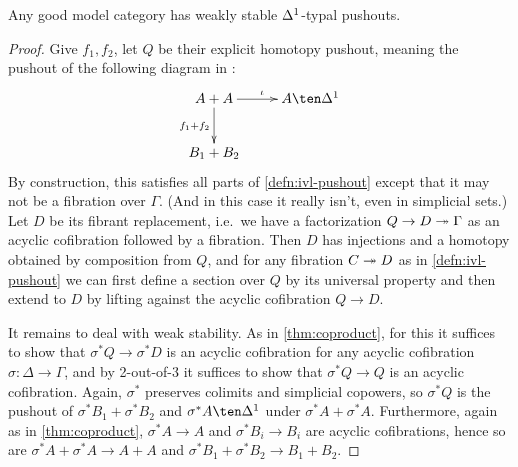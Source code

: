 \documentclass{amsart}
\begin{document}
\begin{thm}
  Any good model category has weakly stable ${\Delta^1}$-typal pushouts.
\end{thm}
\begin{proof}
  Give $f_1,f_2$, let $Q$ be their explicit homotopy pushout, meaning the pushout of the following diagram in \sM:
  \[ \xymatrix{ A+A \ar[r]^{\iota} \ar[d]_{f_1+f_2} & A\ten\ivl \\ B_1+B_2 } \]
  By construction, this satisfies all parts of \cref{defn:ivl-pushout} except that it may not be a fibration over $\Gamma$.
  (And in this case it really isn't, even in simplicial sets.)
  Let $D$ be its fibrant replacement, i.e.\ we have a factorization $Q\to D \twoheadrightarrow \Gamma$ as an acyclic cofibration followed by a fibration.
  Then $D$ has injections and a homotopy obtained by composition from $Q$, and for any fibration $C\twoheadrightarrow D$ as in \cref{defn:ivl-pushout} we can first define a section over $Q$ by its universal property and then extend to $D$ by lifting against the acyclic cofibration $Q\to D$.

  It remains to deal with weak stability.
  As in \cref{thm:coproduct}, for this it suffices to show that $\sigma^*Q\to\sigma^*D$ is an acyclic cofibration for any acyclic cofibration $\sigma:\Delta\to\Gamma$, and by 2-out-of-3 it suffices to show that $\sigma^*Q \to Q$ is an acyclic cofibration.
  Again, $\sigma^*$ preserves colimits and simplicial copowers, so $\sigma^*Q $ is the pushout of $\sigma^*B_1+\sigma^*B_2$ and $\sigma^*A \ten\ivl$ under $\sigma^*A+\sigma^*A$.
  Furthermore, again as in \cref{thm:coproduct}, $\sigma^*A \to A$ and $\sigma^*B_i \to B_i$ are acyclic cofibrations, hence so are $\sigma^*A+\sigma^*A \to A+A$ and ${\sigma^*B_1 +\sigma^*B_2} \to B_1+B_2$.


\end{proof}
\end{document}

